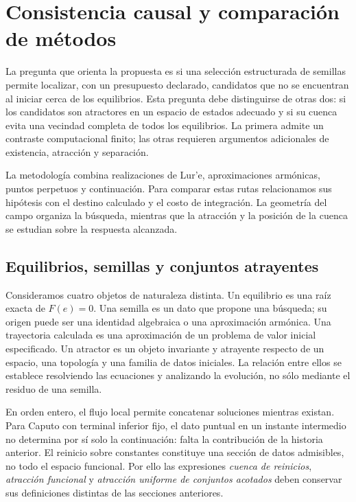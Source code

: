 \section{Consistencia causal y comparación de métodos}
\label{sec:auditoria-actual-resultados}

La pregunta que orienta la propuesta es si una selección estructurada de
semillas permite localizar, con un presupuesto declarado, candidatos que no
se encuentran al iniciar cerca de los equilibrios. Esta pregunta debe
distinguirse de otras dos: si los candidatos son atractores en un espacio de
estados adecuado y si su cuenca evita una vecindad completa de todos los
equilibrios. La primera admite un contraste computacional finito; las otras
requieren argumentos adicionales de existencia, atracción y separación.

La metodología combina realizaciones de Lur'e, aproximaciones armónicas,
puntos perpetuos y continuación. Para comparar estas rutas relacionamos
sus hipótesis con el destino calculado y el costo de integración. La
geometría del campo organiza la búsqueda, mientras que la atracción y la
posición de la cuenca se estudian sobre la respuesta alcanzada.

\subsection{Equilibrios, semillas y conjuntos atrayentes}

Consideramos cuatro objetos de naturaleza distinta. Un equilibrio es una
raíz exacta de $F(e)=0$. Una semilla es un dato que propone una búsqueda; su
origen puede ser una identidad algebraica o una aproximación armónica. Una
trayectoria calculada es una aproximación de un problema de valor inicial
especificado. Un atractor es un objeto invariante y atrayente respecto de un
espacio, una topología y una familia de datos iniciales. La relación entre ellos se establece resolviendo las ecuaciones y
analizando la evolución, no sólo mediante el residuo de una semilla.

En orden entero, el flujo local permite concatenar soluciones mientras
existan. Para Caputo con terminal inferior fijo, el dato puntual en un
instante intermedio no determina por sí solo la continuación: falta la
contribución de la historia anterior. El reinicio sobre constantes constituye
una sección de datos admisibles, no todo el espacio funcional. Por ello las
expresiones \emph{cuenca de reinicios}, \emph{atracción funcional} y
\emph{atracción uniforme de conjuntos acotados} deben conservar sus
definiciones distintas de las secciones anteriores.

